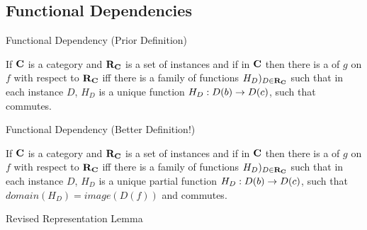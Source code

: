 \documentclass[xcolor=pst,dvips]{beamer}
\begin{document}
\subsection{Functional Dependencies}
\begin{frame} {Functional Dependency (Prior Definition)}
\begin{definition}
If $\textbf{C}$ is a category and $\textbf{R}_{\textbf{C}}$ is a set of instances and if \fgsourcediag
in $\textbf{C}$ then there is a   of $g$ on $f$ with respect to $\textbf{R}_{\textbf{C}}$ iff
there is a family of functions $H_D)_{D \in \textbf{R}_{\textbf{C}}}$ such that 
in each instance $D$, $H_D$ is a unique function $H_D: D(b) \rightarrow D(c)$, such that 
 commutes.
\end{definition}
\end{frame}

\begin{frame} {Functional Dependency (Better Definition!)}
\begin{definition}
If $\textbf{C}$ is a category and $\textbf{R}_{\textbf{C}}$ is a set of instances and if \fgsourcediag
in $\textbf{C}$ then there is a   of $g$ on $f$ with respect to $\textbf{R}_{\textbf{C}}$ iff
there is a family of functions $H_D)_{D \in \textbf{R}_{\textbf{C}}}$ such that 
in each instance $D$, $H_D$ is a unique partial function $H_D: D(b) \rightarrow D(c)$, such that
$domain(H_D) = image(D(f))$ and
 commutes.
\end{definition}
\end{frame}

\begin{frame}{Revised Representation Lemma}


\end{frame}
\end{document}
